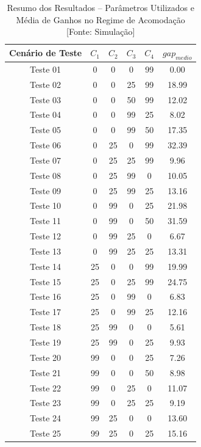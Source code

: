 \begin{table}[!h]
	\begin{center}
		\caption[Resumo dos Resultados \--- Par{\^a}metros Utilizados e M{\'e}dia de Ganhos no Regime de Acomoda{\c c}{\~a}o]{Resumo dos Resultados \--- Par{\^a}metros Utilizados e M{\'e}dia de Ganhos no Regime de Acomoda{\c c}{\~a}o [Fonte: Simula{\c c}{\~a}o]}
		\label{tab:compara}
		\vspace{5pt}
		\begin{tabular}{c c c c c c}
			\hline
			\textbf{Cen{\'a}rio de Teste} & \textbf{$C_{1}$} & \textbf{$C_{2}$} & \textbf{$C_{3}$} & \textbf{$C_{4}$} & \textbf{$gap_{medio}$} \\
			\hline\hline
			Teste 01 & 0 & 0 & 0 & 99 & 0.00 \\
			Teste 02 & 0 & 0 & 25 & 99 & 18.99 \\
			Teste 03 & 0 & 0 & 50 & 99 & 12.02 \\
			Teste 04 & 0 & 0 & 99 & 25 & 8.02 \\
			Teste 05 & 0 & 0 & 99 & 50 & 17.35 \\
			Teste 06 & 0 & 25 & 0 & 99 & 32.39 \\
			Teste 07 & 0 & 25 & 25 & 99 & 9.96 \\
			Teste 08 & 0 & 25 & 99 & 0 & 10.05 \\
			Teste 09 & 0 & 25 & 99 & 25 & 13.16 \\
			Teste 10 & 0 & 99 & 0 & 25 & 21.98 \\
			Teste 11 & 0 & 99 & 0 & 50 & 31.59 \\
			Teste 12 & 0 & 99 & 25 & 0 & 6.67 \\
			Teste 13 & 0 & 99 & 25 & 25 & 13.31 \\
			Teste 14 & 25 & 0 & 0 & 99 & 19.99 \\
			Teste 15 & 25 & 0 & 25 & 99 & 24.75 \\
			Teste 16 & 25 & 0 & 99 & 0 & 6.83 \\
			Teste 17 & 25 & 0 & 99 & 25 & 12.16 \\
			Teste 18 & 25 & 99 & 0 & 0 & 5.61 \\
			Teste 19 & 25 & 99 & 0 & 25 & 9.93 \\
			Teste 20 & 99 & 0 & 0 & 25 & 7.26 \\
			Teste 21 & 99 & 0 & 0 & 50 & 8.98 \\
			Teste 22 & 99 & 0 & 25 & 0 & 11.07 \\
			Teste 23 & 99 & 0 & 25 & 25 & 9.19 \\
			Teste 24 & 99 & 25 & 0 & 0 & 13.60 \\
			Teste 25 & 99 & 25 & 0 & 25 & 15.16 \\
			\hline
		\end{tabular}
	\end{center}
\end{table}

